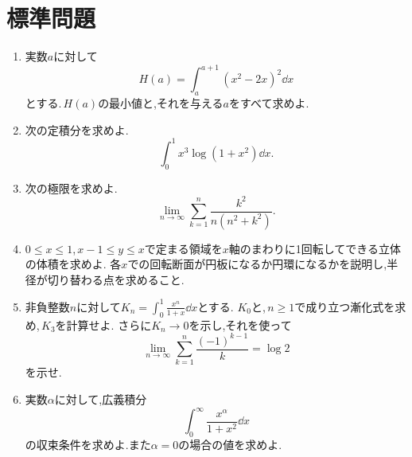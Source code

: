 \section{標準問題}\label{節:総合標準}

\begin{enumerate}[label=\textbf{\thechapter.\arabic*},leftmargin=*,start=7]
 \item\label{問:総合七区間の最適化}
 実数$a$に対して
 \[
  H(a)=\int_a^{a+1}(x^2-2x)^2\dd x
 \]
 とする.\,$H(a)$の最小値と,それを与える$a$をすべて求めよ.
 \item\label{問:総合八置換と部分積分}
 次の定積分を求めよ.
 \[
  \int_0^1x^3\log(1+x^2)\dd x.
 \]
 \item\label{問:総合九区分求積}
 次の極限を求めよ.
 \[
  \lim_{n\to\infty}\sum_{k=1}^{n}\frac{k^2}{n(n^2+k^2)}.
 \]
 \item\label{問:総合十軸を横切る回転}
 $0\le x\le1$,\,$x-1\le y\le x$で定まる領域を$x$軸のまわりに1回転してできる立体の体積を求めよ.
 各$x$での回転断面が円板になるか円環になるかを説明し,半径が切り替わる点を求めること.
 \item\label{問:総合十一漸化式}
 非負整数$n$に対して$K_n=\int_0^1\frac{x^n}{1+x}\dd x$とする.
 $K_0$と,\,$n\ge1$で成り立つ漸化式を求め,\,$K_3$を計算せよ.
 さらに$K_n\to0$を示し,それを使って
 \[
  \lim_{n\to\infty}\sum_{k=1}^{n}\frac{(-1)^{k-1}}{k}=\log2
 \]
 を示せ.
 \item\label{問:総合十二両端判定}
 実数$\alpha$に対して,広義積分
 \[
  \int_0^{\infty}\frac{x^\alpha}{1+x^2}\dd x
 \]
 の収束条件を求めよ.また$\alpha=0$の場合の値を求めよ.
\end{enumerate}


